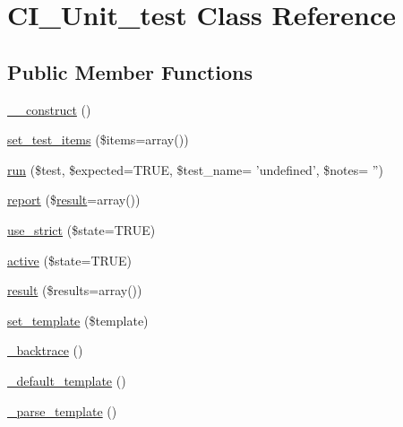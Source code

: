 \hypertarget{class_c_i___unit__test}{\section{C\-I\-\_\-\-Unit\-\_\-test Class Reference}
\label{class_c_i___unit__test}
}
\subsection*{Public Member Functions}
\begin{DoxyCompactItemize}
\item 
\hyperlink{class_c_i___unit__test_a095c5d389db211932136b53f25f39685}{\-\_\-\-\_\-construct} ()
\item 
\hyperlink{class_c_i___unit__test_a442e8500d711fa6b2b27fb258f90bc7e}{set\-\_\-test\-\_\-items} (\$items=array())
\item 
\hyperlink{class_c_i___unit__test_a4589c9182b5cd90f438b0ff9beea4aab}{run} (\$test, \$expected=T\-R\-U\-E, \$test\-\_\-name= 'undefined', \$notes= '')
\item 
\hyperlink{class_c_i___unit__test_a339c46eabb709c1c492bc264c9634171}{report} (\$\hyperlink{class_c_i___unit__test_adcfdd404b2f2610e0690b4beb7786ce5}{result}=array())
\item 
\hyperlink{class_c_i___unit__test_a3b12a79f69fab4221a0b887bdac1ba83}{use\-\_\-strict} (\$state=T\-R\-U\-E)
\item 
\hyperlink{class_c_i___unit__test_ac7b3030630fc7dd31513c75cf27c1a8a}{active} (\$state=T\-R\-U\-E)
\item 
\hyperlink{class_c_i___unit__test_adcfdd404b2f2610e0690b4beb7786ce5}{result} (\$results=array())
\item 
\hyperlink{class_c_i___unit__test_ae65d1ab2a626d4ddfda31befc2b347f6}{set\-\_\-template} (\$template)
\item 
\hyperlink{class_c_i___unit__test_aae40ff64c7daf1d70efaf110181a257e}{\-\_\-backtrace} ()
\item 
\hyperlink{class_c_i___unit__test_ae1990fcb9ffc455614eeac9a1091f0b0}{\-\_\-default\-\_\-template} ()
\item 
\hyperlink{class_c_i___unit__test_a884e99b431f75c1ad17ba9753dab3b49}{\-\_\-parse\-\_\-template} ()
\end{DoxyCompactItemize}
